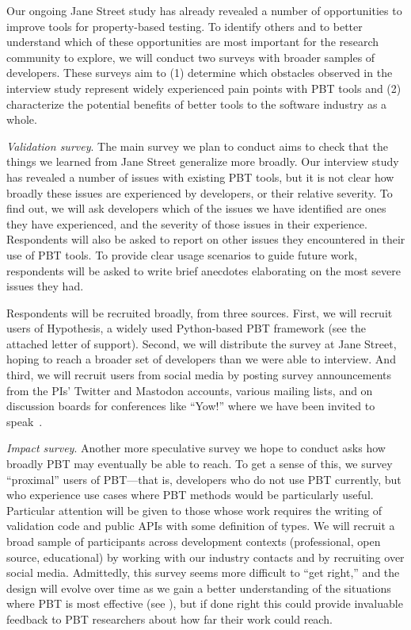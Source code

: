 %
Our ongoing Jane Street study has already revealed a number of
opportunities to improve tools for property-based testing. To identify
others and to better understand which of these opportunities are most
important for the research community to explore, we will conduct two
surveys with broader samples of developers. These surveys aim to
(1) determine which obstacles observed in the interview study
represent widely experienced pain points with PBT tools and
(2) characterize the potential benefits of better tools to the
software industry as a whole.

\emph{Validation survey}. The main survey we plan to conduct aims to check that
the things we learned from Jane Street generalize more broadly.
Our interview study has revealed
a number of issues with existing PBT tools, but it is not clear
how broadly these issues are experienced by developers, or
their relative severity. To find out, we will
ask developers which of the issues we have identified are
ones they have experienced, and the severity of those issues
in their experience. Respondents will also be asked to report on
other issues they encountered in their use of PBT tools.
To provide
clear usage scenarios to guide future work, respondents will
be asked to write brief anecdotes elaborating on the
most severe issues they had.

Respondents will
be recruited broadly, from three sources. First, we will recruit
users of Hypothesis, a widely used Python-based PBT
framework
(see the attached letter of support).
Second, we will distribute the survey at Jane Street, hoping to reach
a broader set of developers than we were able to interview.
And third, we will recruit users from social media by posting
survey announcements from the PIs' Twitter and Mastodon
accounts, various mailing lists, and on discussion boards for conferences like
``Yow!'' where we have been invited to speak~\cite{noauthor_when_nodate}.

\emph{Impact survey}. Another more speculative survey we hope to conduct asks
how broadly PBT may eventually be able to reach.  To get a sense of this, we
survey ``proximal'' users of PBT---that is, developers who do not use PBT
currently, but who experience use cases where PBT methods would be particularly
useful.  Particular attention will be given to those whose work requires the
writing of validation code and public APIs with some definition of types. We
will recruit a broad sample of participants across development contexts
(professional, open source, educational) by working with our industry contacts
and by recruiting over social media. Admittedly, this survey seems more
difficult to ``get right,'' and the design will evolve over time as we gain a
better understanding of the situations where PBT is most effective
(see ), but if done right this could provide invaluable
feedback to PBT researchers about how far their work could reach.

